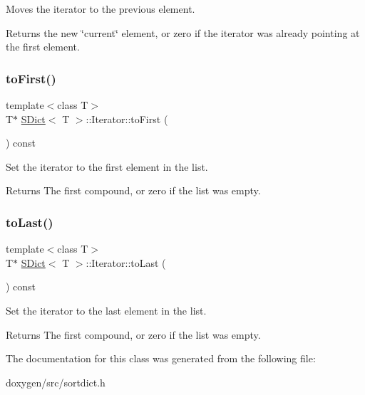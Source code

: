 Moves the iterator to the previous element. \begin{DoxyReturn}{Returns}
the new \char`\"{}current\char`\"{} element, or zero if the iterator was already pointing at the first element. 
\end{DoxyReturn}
\mbox{\label{class_s_dict_1_1_iterator_a94abefe0aa26d1f5c32ebeef13a69223}} 
\subsubsection{\texorpdfstring{toFirst()}{toFirst()}}
{\footnotesize\ttfamily template$<$class T$>$ \\
T$\ast$ \mbox{\hyperlink{class_s_dict}{S\+Dict}}$<$ T $>$\+::Iterator\+::to\+First (\begin{DoxyParamCaption}{ }\end{DoxyParamCaption}) const\hspace{0.3cm}{\ttfamily [inline]}}

Set the iterator to the first element in the list. \begin{DoxyReturn}{Returns}
The first compound, or zero if the list was empty. 
\end{DoxyReturn}
\mbox{\label{class_s_dict_1_1_iterator_a5a634151c5aeccee715c26aceea155e3}} 
\subsubsection{\texorpdfstring{toLast()}{toLast()}}
{\footnotesize\ttfamily template$<$class T$>$ \\
T$\ast$ \mbox{\hyperlink{class_s_dict}{S\+Dict}}$<$ T $>$\+::Iterator\+::to\+Last (\begin{DoxyParamCaption}{ }\end{DoxyParamCaption}) const\hspace{0.3cm}{\ttfamily [inline]}}

Set the iterator to the last element in the list. \begin{DoxyReturn}{Returns}
The first compound, or zero if the list was empty. 
\end{DoxyReturn}


The documentation for this class was generated from the following file\+:\begin{DoxyCompactItemize}
\item 
doxygen/src/sortdict.\+h\end{DoxyCompactItemize}
